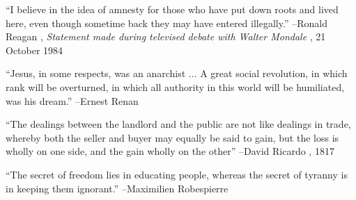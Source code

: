 \documentclass{article}%
\begin{document}
\begin{minipage}{\textwidth}%
\flushleft%
“I believe in the idea of amnesty for those who have put down roots and lived here, even though sometime back they may have entered illegally.”%
\linebreak%
\vspace{1mm}%
–Ronald Reagan%
, \textit{Statement made during televised debate with Walter Mondale}%
, 21 October 1984%
\linebreak%
\vspace{1mm}%
\end{minipage}%
\linebreak%
\vspace{1mm}%
\begin{minipage}{\textwidth}%
\flushleft%
“Jesus, in some respects, was an anarchist ... A great social revolution, in which rank will be overturned, in which all authority in this world will be humiliated, was his dream.”%
\linebreak%
\vspace{1mm}%
–Ernest Renan%
\linebreak%
\vspace{1mm}%
\end{minipage}%
\linebreak%
\vspace{1mm}%
\begin{minipage}{\textwidth}%
\flushleft%
“The dealings between the landlord and the public are not like dealings in trade, whereby both the seller and buyer may equally be said to gain, but the loss is wholly on one side, and the gain wholly on the other”%
\linebreak%
\vspace{1mm}%
–David Ricardo%
, 1817%
\linebreak%
\vspace{1mm}%
\end{minipage}%
\linebreak%
\vspace{1mm}%
\begin{minipage}{\textwidth}%
\flushleft%
“The secret of freedom lies in educating people, whereas the secret of tyranny is in keeping them ignorant.”%
\linebreak%
\vspace{1mm}%
–Maximilien Robespierre%
\linebreak%
\vspace{1mm}%
\end{minipage}%
\linebreak%
\vspace{1mm}%
\end{document}
